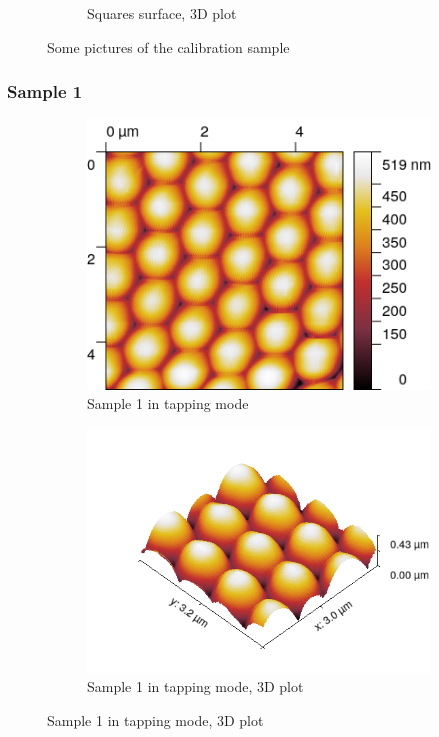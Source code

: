 \documentclass[11pt,a4paper]{article}
\begin{document}
\begin{figure}[H]
\begin{subfigure}[b]{0.45\textwidth}
\caption{Squares surface, 3D plot}
\label{fig:sm_border}
\end{subfigure}
\caption{Some pictures of the calibration sample}
\end{figure}

\subsubsection{Sample 1}

\begin{figure}[H]
\centering
\begin{subfigure}[b]{0.45\textwidth}
\includegraphics[width=\textwidth]{tm_sample1}
\caption{Sample 1 in tapping mode}
\label{fig:}
\end{subfigure}
\begin{subfigure}[b]{0.45\textwidth}
\includegraphics[width=\textwidth]{tm_sample1_3D}
\caption{Sample 1 in tapping mode, 3D plot}
\label{fig:}
\end{subfigure}
\end{figure}
\end{document}

